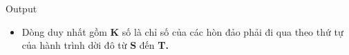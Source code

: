 Output
\begin{itemize}
	\item Dòng duy nhất gồm \textbf{ K } số là chỉ số của các hòn đảo phải đi qua theo thứ tự của hành trình dời đô từ \textbf{ S } đến \textbf{ T. }
\end{itemize}